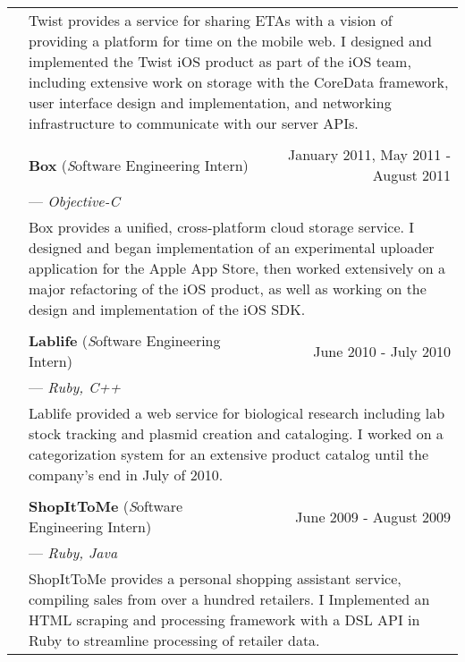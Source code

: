 \documentclass{article}
\begin{document}
\begin{tabular}{llr}
  & \multicolumn{2}{p{6in}}{Twist provides a service for sharing ETAs with a
    vision of providing a platform for time on the mobile web. I designed and
    implemented the Twist iOS product as part of the iOS team, including
    extensive work on storage with the CoreData framework, user interface design
    and implementation, and networking infrastructure to communicate with our
    server APIs.}\\

  \\

  & {\large\bf Box} ({\emph Software Engineering Intern}) & January 2011, May 2011 - August 2011\\
  & \multicolumn{2}{l}{---  \emph{Objective-C}} \\

  & \multicolumn{2}{p{6in}}{Box provides a unified, cross-platform cloud storage
    service. I designed and began implementation of an experimental uploader
    application for the Apple App Store, then worked extensively on a major
    refactoring of the iOS product, as well as working on the design and
    implementation of the iOS SDK.}\\

  \\

  & {\large\bf Lablife} ({\emph Software Engineering Intern}) & June 2010 - July 2010\\
  & \multicolumn{2}{l}{---  \emph{Ruby, C++}} \\

  & \multicolumn{2}{p{6in}}{Lablife provided a web service for biological
    research including lab stock tracking and plasmid creation and cataloging. I
    worked on a categorization system for an extensive product catalog until the
    company's end in July of 2010.}\\

  \\

  & {\large\bf ShopItToMe} ({\emph Software Engineering Intern}) & June 2009 - August 2009\\
  & \multicolumn{2}{l}{---  \emph{Ruby, Java}} \\

  & \multicolumn{2}{p{6in}}{ShopItToMe provides a personal shopping assistant
    service, compiling sales from over a hundred retailers. I Implemented an
    HTML scraping and processing framework with a DSL API in Ruby to streamline
    processing of retailer data.}\\


\end{tabular}
\end{document}
